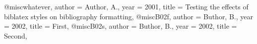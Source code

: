 @misc{whatever,
  author = {Author, A.},
  year = {2001},
  title = {Testing the effects of biblatex styles on bibliography formatting},
}
@misc{B02f,
  author = {Buthor, B.},
  year = {2002},
  title = {First},
}
@misc{B02s,
  author = {Buthor, B.},
  year = {2002},
  title = {Second},
}
